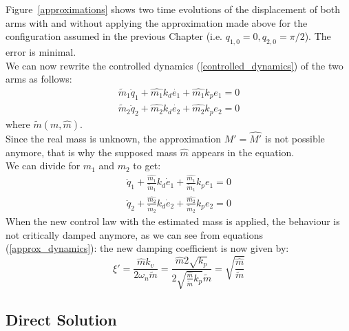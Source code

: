 \documentclass[a4paper,12pt,oneside]{report}
\begin{document}
Figure~\ref{approximations} shows two time evolutions of the displacement of both arms with and without applying the approximation made above for the configuration assumed in the previous Chapter (i.e. $q_{1,0}=0,q_{2,0}=\pi/2$). The error is minimal.\\
We can now rewrite the controlled dynamics (\ref{controlled_dynamics}) of the two arms as follows:
\begin{equation}
  \begin{array}{l}
    \tilde{m}_1\ddot{q}_1+\hat{m_1}k_d\dot{e_1}+\hat{m_1}k_p e_1=0\\
    \tilde{m}_2\ddot{q}_2+\hat{m_2}k_d\dot{e_2}+\hat{m_2}k_p e_2=0
  \end{array}
\end{equation}
where $\tilde{m}(m,\hat{m})$.\\
Since the real mass is unknown, the approximation $M'=\hat{M'}$ is not possible anymore, that is why the supposed mass $\hat{m}$ appears in the equation.\\
We can divide for $m_1$ and $m_2$ to get:
\begin{equation}
  \begin{array}{l}
    \ddot{q}_1+\frac{\hat{m_1}}{\tilde{m}_1}k_d\dot{e}_1+\frac{\hat{m_1}}{\tilde{m}_1}k_p e_1=0\\
    \ddot{q}_2+\frac{\hat{m_2}}{\tilde{m}_2}k_d\dot{e}_2+\frac{\hat{m_2}}{\tilde{m}_2}k_p e_2=0
  \end{array}
  \label{approx_dynamics}
\end{equation}
When the new control law with the estimated mass is applied, the behaviour is not critically damped anymore, as we can see from equations (\ref{approx_dynamics}): the new damping coefficient is now given by:
\begin{equation}
  \xi'=\frac{\hat{m}k_v}{2\omega_n \tilde{m}}=\frac{\hat{m}2\sqrt{k_p}}{2\sqrt{\frac{\hat{m}}{\tilde{m}}k_p} \tilde{m}}=\sqrt{\frac{\hat{m}}{\tilde{m}}}
  \label{mass_relation}
\end{equation}
\newpage
\subsection{Direct Solution}
\end{document}
